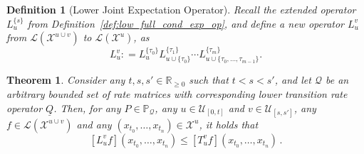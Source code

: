 \documentclass[10pt]{paper}
\newtheorem{theorem}{Theorem}
\newtheorem{definition}{Definition}
\newcommand{\reals}{\mathbb{R}}
\newcommand{\realsnonneg}{\reals_{\geq 0}}
\newcommand{\states}{\mathcal{X}}
\newcommand{\gambles}{\mathcal{L}}
\newcommand{\lrate}{\underline{Q}}
\newcommand{\coloneqq}{:\!=}
\begin{document}
\begin{definition}[Lower Joint Expectation Operator]\label{def:low_joint_exp_op}
Recall the extended operator $L_u^{\{s\}}$ from Definition~\ref{def:low_full_cond_exp_op}, and define a new operator $L_u^v$ from $\gambles(\states^{u\cup v})$ to $\gambles(\states^u)$, as
\begin{equation*}
L_u^v \coloneqq L_u^{\{\tau_0\}}L_{u\cup\{\tau_0\}}^{\{\tau_1\}}\cdots L_{u\cup\{\tau_0,\ldots,\tau_{m-1}\}}^{\{\tau_m\}}.
\end{equation*}
\end{definition}

\begin{theorem}\label{theorem:nonmarkov_multi_variable_lower_bounded}
Consider any $t,s,s'\in\realsnonneg$ such that $t<s<s'$, and let $\mathcal{Q}$ be an arbitrary bounded set of rate matrices with corresponding lower transition rate operator $\lrate$. Then, for any $P\in\mathbb{P}_\mathcal{Q}$, any $u\in\mathcal{U}_{[0,t]}$ and $v\in\mathcal{U}_{[s,s']}$, any $f\in\gambles(\states^{u\cup v})$ and any $(x_{t_0},\ldots,x_{t_n})\in\states^u$, it holds that
\begin{equation*}
\left[L_u^v f\right](x_{t_0},\ldots,x_{t_n}) \leq \left[T_u^v f\right](x_{t_0},\ldots,x_{t_n})\,.
\end{equation*}
\end{theorem}
\end{document}
